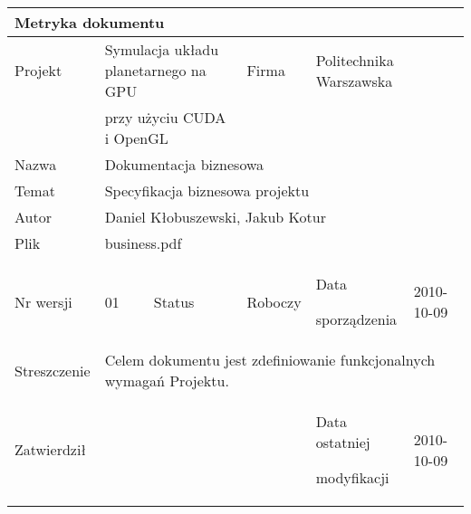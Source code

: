 \begin{tabular}{|p{}|p{}|p{}|p{}|p{}|p{}|}
	\hline
	\multicolumn{6}{|l|}{Metryka dokumentu} \\
	\hline
	Projekt & \multicolumn{2}{l|}{Symulacja układu planetarnego na GPU } &
	Firma & \multicolumn{2}{l|}{Politechnika Warszawska} \\
	&  \multicolumn{2}{l|}{przy użyciu CUDA i OpenGL} & &  \multicolumn{2}{l|}{} \\
	\hline
	Nazwa & \multicolumn{5}{l|}{Dokumentacja biznesowa} \\
	\hline
	Temat & \multicolumn{5}{l|}{Specyfikacja biznesowa projektu} \\
	\hline
	Autor & \multicolumn{5}{l|}{Daniel Kłobuszewski, Jakub Kotur} \\
	\hline
	Plik & \multicolumn{5}{l|}{business.pdf} \\
	\hline
	Nr wersji & 01 & Status & Roboczy & Data\par sporządzenia & 2010-10-09 \\
	\hline
	Streszczenie & \multicolumn{5}{p{11cm}|}{Celem dokumentu jest zdefiniowanie
		funkcjonalnych wymagań Projektu.} \\
	\hline
	Zatwierdził & \multicolumn{3}{l|}{ } &
	Data ostatniej\par modyfikacji & 2010-10-09 \\
	\hline
\end{tabular}

